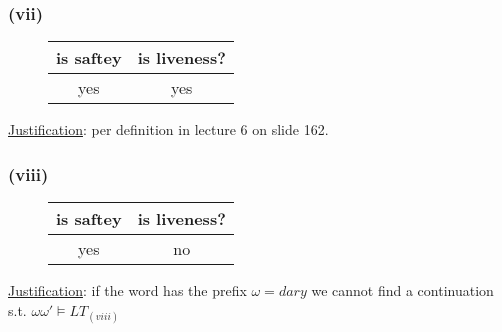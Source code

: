 \documentclass[11pt]{article}
\begin{document}
\subsubsection*{(vii)}
	\vspace*{-2em}
	\begin{figure}[H]
		\centering
		\begin{tabular}{c | c}
			is saftey & is liveness? \\ \hline
			yes & yes \\
		\end{tabular}
	\end{figure}
	\underline{Justification}: per definition in lecture 6 on slide 162.

\subsubsection*{(viii)}
	\vspace*{-2em}
	\begin{figure}[H]
		\centering
		\begin{tabular}{c | c}
			is saftey & is liveness? \\ \hline
			yes & no \\
		\end{tabular}
	\end{figure}
	\underline{Justification}: if the word has the prefix $\omega = {dary}$ we cannot find a continuation s.t. $\omega \omega' \models LT_{(viii)}$
\end{document}
